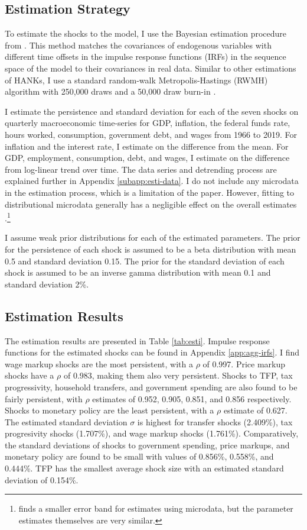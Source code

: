 \subsection{Estimation Strategy}

To estimate the shocks to the model, I use the Bayesian estimation procedure from \textcite{auclert2021using}. This method matches the covariances of endogenous variables with different time offsets in the impulse response functions (IRFs) in the sequence space of the model to their covariances in real data. Similar to other estimations of HANKs, I use a standard random-walk Metropolis-Hastings (RWMH) algorithm with 250,000 draws and a 50,000 draw burn-in \autocites{auclert2021using}{bayer2024shocks}.

I estimate the persistence and standard deviation for each of the seven shocks on quarterly macroeconomic time-series for GDP, inflation, the federal funds rate, hours worked, consumption, government debt, and wages from 1966 to 2019. For inflation and the interest rate, I estimate on the difference from the mean. For GDP, employment, consumption, debt, and wages, I estimate on the difference from log-linear trend over time. The data series and detrending process are explained further in Appendix \ref{subapp:esti-data}. I do not include any microdata in the estimation process, which is a limitation of the paper. However, fitting to distributional microdata generally has a negligible effect on the overall estimates \autocite{bayer2024shocks}.\footnote{\textcite{iao2024estimating} finds a smaller error band for estimates using microdata, but the parameter estimates themselves are very similar.}

I assume weak prior distributions for each of the estimated parameters. The prior for the persistence of each shock is assumed to be a beta distribution with mean 0.5 and standard deviation 0.15. The prior for the standard deviation of each shock is assumed to be an inverse gamma distribution with mean 0.1 and standard deviation 2\%.


\subsection{Estimation Results}

The estimation results are presented in Table \ref{tab:esti}. Impulse response functions for the estimated shocks can be found in Appendix \ref{app:agg-irfs}. I find wage markup shocks are the most persistent, with a $\rho$ of 0.997. Price markup shocks have a $\rho$ of 0.983, making them also very persistent. Shocks to TFP, tax progressivity, household transfers, and government spending are also found to be fairly persistent, with $\rho$ estimates of 0.952, 0.905, 0.851, and 0.856 respectively. Shocks to monetary policy are the least persistent, with a $\rho$ estimate of 0.627. The estimated standard deviation $\sigma$ is highest for transfer shocks (2.409\%), tax progresivity shocks (1.707\%), and wage markup shocks (1.761\%). Comparatively, the standard deviations of shocks to government spending, price markups, and monetary policy are found to be small with values of 0.856\%, 0.558\%, and 0.444\%. TFP has the smallest average shock size with an estimated standard deviation of 0.154\%.

